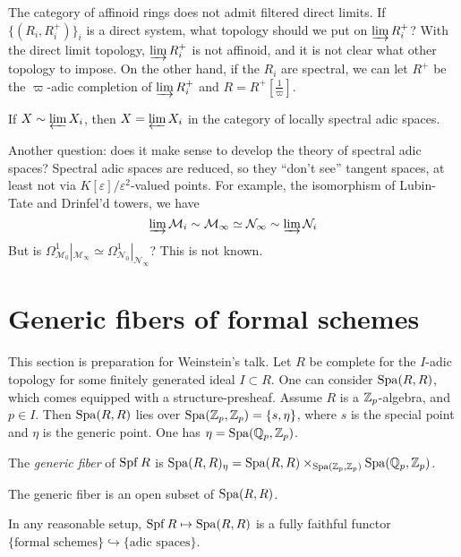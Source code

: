 \documentclass{article}
\begin{document}
The category of affinoid rings does not admit filtered direct limits. If 
$\{(R_i,R_i^+)\}_i$ is a direct system, what topology should we put on 
$\varinjlim R_i^+$? With the direct limit topology, $\varinjlim R_i^+$ is not 
affinoid, and it is not clear what other topology to impose. On the other hand, 
if the $R_i$ are spectral, we can let $R^+$ be the $\varpi$-adic completion of 
$\varinjlim R_i^+$ and $R=R^+[\frac 1 \varpi]$. 

\begin{proposition}
If $X\sim \varprojlim X_i$, then $X=\varprojlim X_i$ in the category of 
locally spectral adic spaces. 
\end{proposition}

Another question: does it make sense to develop the theory of spectral adic spaces? 
Spectral adic spaces are reduced, so they ``don't see'' tangent spaces, at least 
not via $K[\varepsilon]/\varepsilon^2$-valued points. For example, the isomorphism of 
Lubin-Tate and Drinfel'd towers, we have 
\[
  \varinjlim \mathcal M_i \sim \mathcal M_\infty\simeq \mathcal N_\infty \sim \varinjlim \mathcal N_i
\]
But is $\Omega_{\mathcal M_0}^1|_{\mathcal M_\infty}\simeq \Omega_{\mathcal N_0}^1|_{\mathcal N_\infty}$? This is not known. 





\section{Generic fibers of formal schemes}

This section is preparation for Weinstein's talk. Let $R$ be complete for the 
$I$-adic topology for some finitely generated ideal $I\subset R$. One can 
consider $\operatorname{Spa}(R,R)$, which comes equipped with a structure-presheaf. Assume 
$R$ is a $\mathbb{Z}_p$-algebra, and $p\in I$. Then $\operatorname{Spa}(R,R)$ lies over 
$\operatorname{Spa}(\mathbb{Z}_p,\mathbb{Z}_p) = \{s,\eta\}$, where $s$ is the special point and $\eta$ is 
the generic point. One has $\eta=\operatorname{Spa}(\mathbb{Q}_p,\mathbb{Z}_p)$. 

\begin{definition}
The \emph{generic fiber} of $\operatorname{Spf} R$ is $\operatorname{Spa}(R,R)_\eta = \operatorname{Spa}(R,R)\times_{\operatorname{Spa}(\mathbb{Z}_p,\mathbb{Z}_p)} \operatorname{Spa}(\mathbb{Q}_p,\mathbb{Z}_p)$. 
\end{definition}
The generic fiber is an open subset of $\operatorname{Spa}(R,R)$. 

In any reasonable setup, $\operatorname{Spf} R\mapsto \operatorname{Spa}(R,R)$ is a fully faithful functor 
$\{\text{formal schemes}\}\hookrightarrow \{\text{adic spaces}\}$. 
\end{document}
